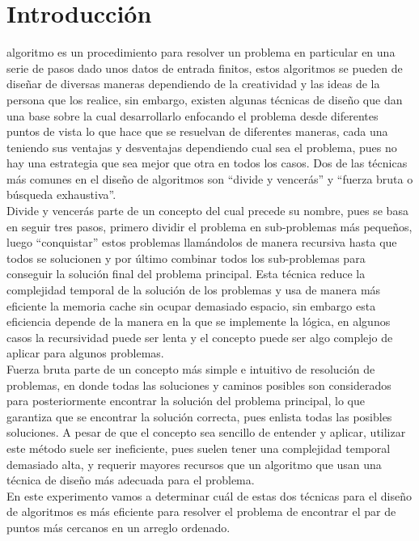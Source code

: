 \section{Introducción}
 algoritmo es un procedimiento para resolver un problema en particular en una serie de pasos dado unos datos de entrada finitos, estos algoritmos se pueden de diseñar de diversas maneras dependiendo de la creatividad y las ideas de la persona que los realice, sin embargo, existen algunas técnicas de diseño que dan una base sobre la cual desarrollarlo enfocando el problema desde diferentes puntos de vista lo que hace que se resuelvan de diferentes maneras, cada una teniendo sus ventajas y desventajas dependiendo cual sea el problema, pues no hay una estrategia que sea mejor que otra en todos los casos. Dos de las técnicas más comunes en el diseño de algoritmos son “divide y vencerás” y “fuerza bruta o búsqueda exhaustiva”. \cite{DesignTechniques} \\

Divide y vencerás parte de un concepto del cual precede su nombre, pues se basa en seguir tres pasos, primero dividir el problema en sub-problemas más pequeños, luego “conquistar” estos problemas llamándolos de manera recursiva hasta que todos se solucionen y por último combinar todos los sub-problemas para conseguir la solución final del problema principal. Esta técnica reduce la complejidad temporal de la solución de los problemas y usa de manera más eficiente la memoria cache sin ocupar demasiado espacio, sin embargo esta eficiencia depende de la manera en la que se implemente la lógica, en algunos casos la recursividad puede ser lenta y el concepto puede ser algo complejo de aplicar para algunos problemas. \cite{DivideAndConquer}\\

Fuerza bruta parte de un concepto más simple e intuitivo de resolución de problemas, en donde todas las soluciones y caminos posibles son considerados para posteriormente encontrar la solución del problema principal, lo que garantiza que se encontrar la solución correcta, pues enlista todas las posibles soluciones. A pesar de que el concepto sea sencillo de entender y aplicar, utilizar este método suele ser ineficiente, pues suelen tener una complejidad temporal demasiado alta, y requerir mayores recursos que un algoritmo que usan una técnica de diseño más adecuada para el problema. \cite{BruteForce}\\

En este experimento vamos a determinar cuál de estas dos técnicas para el diseño de algoritmos es más eficiente para resolver el problema de encontrar el par de puntos más cercanos en un arreglo ordenado.